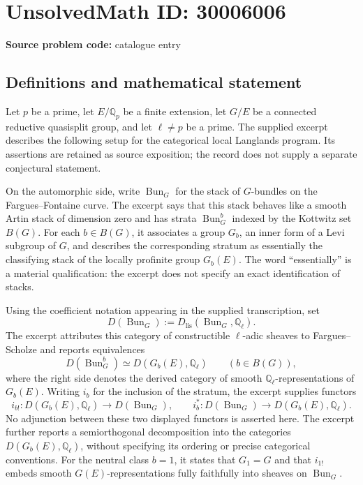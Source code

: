 \documentclass[11pt]{article}
\newcommand{\Q}{\mathbb{Q}}
\begin{document}
\section*{UnsolvedMath ID: 30006006}
\textbf{Source problem code:} catalogue entry
\subsection{Definitions and mathematical statement}
Let \(p\) be a prime, let \(E/\Q_p\) be a finite extension, let \(G/E\) be a connected reductive quasisplit group, and let \(\ell\ne p\) be a prime. The supplied excerpt describes the following setup for the categorical local Langlands program. Its assertions are retained as source exposition; the record does not supply a separate conjectural statement.

On the automorphic side, write \(\operatorname{Bun}_G\) for the stack of \(G\)-bundles on the Fargues--Fontaine curve. The excerpt says that this stack behaves like a smooth Artin stack of dimension zero and has strata \(\operatorname{Bun}_G^b\) indexed by the Kottwitz set \(B(G)\). For each \(b\in B(G)\), it associates a group \(G_b\), an inner form of a Levi subgroup of \(G\), and describes the corresponding stratum as essentially the classifying stack of the locally profinite group \(G_b(E)\). The word ``essentially'' is a material qualification: the excerpt does not specify an exact identification of stacks.

Using the coefficient notation appearing in the supplied transcription, set
\[
D(\operatorname{Bun}_G):=D_{\mathrm{lis}}(\operatorname{Bun}_G,\Q_\ell).
\]
The excerpt attributes this category of constructible \(\ell\)-adic sheaves to Fargues--Scholze and reports equivalences
\[
D(\operatorname{Bun}_G^b)\simeq D(G_b(E),\Q_\ell)
\qquad (b\in B(G)),
\]
where the right side denotes the derived category of smooth \(\Q_\ell\)-representations of \(G_b(E)\). Writing \(i_b\) for the inclusion of the stratum, the excerpt supplies functors
\[
i_{b!}:D(G_b(E),\Q_\ell)\longrightarrow D(\operatorname{Bun}_G),
\qquad
i_b^*:D(\operatorname{Bun}_G)\longrightarrow D(G_b(E),\Q_\ell).
\]
No adjunction between these two displayed functors is asserted here. The excerpt further reports a semiorthogonal decomposition into the categories \(D(G_b(E),\Q_\ell)\), without specifying its ordering or precise categorical conventions. For the neutral class \(b=1\), it states that \(G_1=G\) and that \(i_{1!}\) embeds smooth \(G(E)\)-representations fully faithfully into sheaves on \(\operatorname{Bun}_G\).
\end{document}
